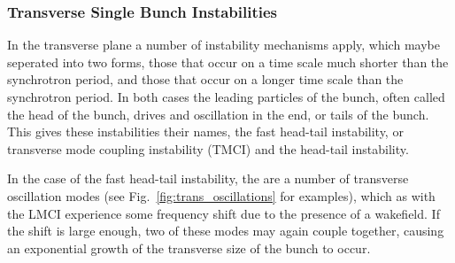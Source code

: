 \subsubsection{Transverse Single Bunch Instabilities}

In the transverse plane a number of instability mechanisms apply, which maybe seperated into two forms, those that occur on a time scale much shorter than the synchrotron period, and those that occur on a longer time scale than the synchrotron period. In both cases the leading particles of the bunch, often called the head of the bunch, drives and oscillation in the end, or tails of the bunch. This gives these instabilities their names, the fast head-tail instability, or transverse mode coupling instability (TMCI) and the head-tail instability.

In the case of the fast head-tail instability, the are a number of transverse oscillation modes (see Fig.~\ref{fig:trans_oscillations} for examples), which as with the LMCI experience some frequency shift due to the presence of a wakefield. If the shift is large enough, two of these modes may again couple together, causing an exponential growth of the transverse size of the bunch to occur.

